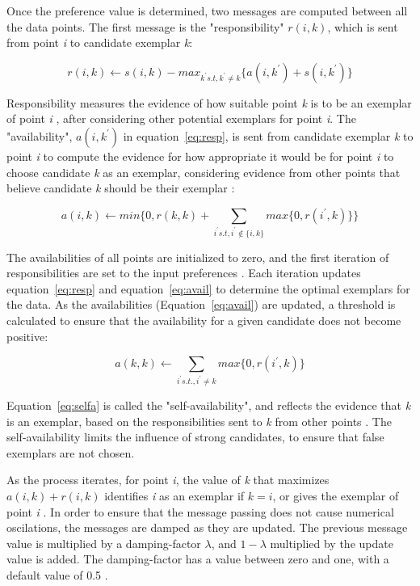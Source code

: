 Once the preference value is determined, two messages are computed between all the data points.
The first message is the "responsibility" $r(i,k)$, which is sent from point \textit{i} to candidate exemplar \textit{k}:\citet{frey07}

\begin{equation}
\label{eq:resp}
r(i,k) \leftarrow s(i,k) - max_{k^\prime s.t,  k^\prime \neq k} \{ a(i,k^\prime) + s(i,k^\prime) \}
\end{equation}

Responsibility measures the evidence of how suitable point \textit{k} is to be an exemplar of point \textit{i} \citet{frey07}, after considering other potential exemplars for point \textit{i}.
The "availability", $a(i,k^\prime)$ in equation~\ref{eq:resp}, is sent from candidate exemplar \textit{k} to point \textit{i} to compute the evidence for how appropriate it would be for point \textit{i} to choose candidate \textit{k} as an exemplar, considering evidence from other points that believe candidate \textit{k} should be their exemplar \citet{frey07}: 

\begin{equation}
\label{eq:avail}
a(i,k) \leftarrow min\Big\{ 0, r(k,k) + \sum\limits_{i^\prime s.t, i^\prime \notin \{i,k\}} max\{0, r(i^\prime, k)\}\Big\}
\end{equation}

The availabilities of all points are initialized to zero, and the first iteration of responsibilities are set to the input preferences \citet{frey07}. 
Each iteration updates equation~\ref{eq:resp} and equation~\ref{eq:avail} to determine the optimal exemplars for the data.
As the availabilities (Equation~\ref{eq:avail}) are updated, a threshold is calculated to ensure that the availability for a given candidate does not become positive: 

\begin{equation}
\label{eq:selfa}
a(k,k) \leftarrow \sum\limits_{i^\prime s.t., i^\prime \neq k} max\Big\{0,r(i^\prime, k)\Big\}
\end{equation}

Equation~\ref{eq:selfa} is called the "self-availability", and reflects the evidence that \textit{k} is an exemplar, based on the responsibilities sent to \textit{k} from other points \citet{frey07}.
The self-availability limits the influence of strong candidates, to ensure that false exemplars are not chosen.

As the process iterates, for point \textit{i}, the value of \textit{k} that maximizes $a(i,k) + r(i,k)$ identifies \textit{i} as an exemplar if $k=i$, or gives the exemplar of point \textit{i} \citet{frey07}.
In order to ensure that the message passing does not cause numerical oscilations, the messages are damped as they are updated. The previous message value is  multiplied by a damping-factor $\lambda$, and $1 - \lambda$ multiplied by the update value is added. The damping-factor has a value between zero and one, with a default value of 0.5 \citet{frey07}.

